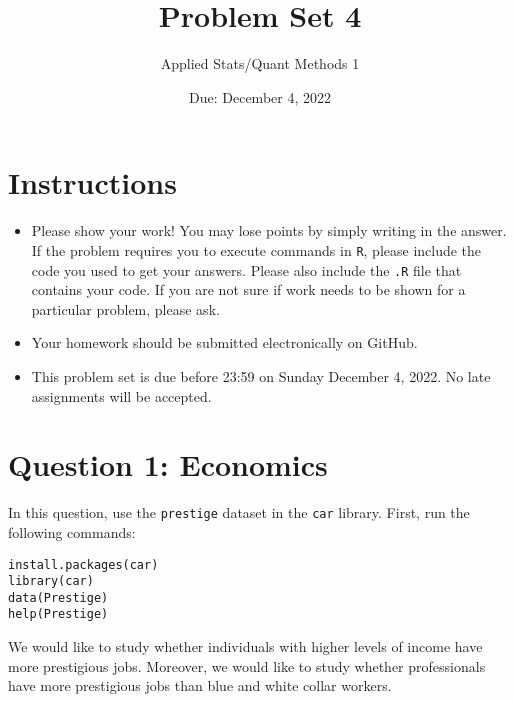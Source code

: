 \documentclass[12pt,letterpaper]{article}
\title{Problem Set 4}
\date{Due: December 4, 2022}
\author{Applied Stats/Quant Methods 1}
\begin{document}
	\maketitle
	\section*{Instructions}
	\begin{itemize}
		\item Please show your work! You may lose points by simply writing in the answer. If the problem requires you to execute commands in \texttt{R}, please include the code you used to get your answers. Please also include the \texttt{.R} file that contains your code. If you are not sure if work needs to be shown for a particular problem, please ask.
		\item Your homework should be submitted electronically on GitHub.
		\item This problem set is due before 23:59 on Sunday December 4, 2022. No late assignments will be accepted.
	\end{itemize}



	\vspace{.5cm}
\section*{Question 1: Economics}
\vspace{.25cm}
\noindent 	
In this question, use the \texttt{prestige} dataset in the \texttt{car} library. First, run the following commands:

\begin{verbatim}
install.packages(car)
library(car)
data(Prestige)
help(Prestige)
\end{verbatim} 


\noindent We would like to study whether individuals with higher levels of income have more prestigious jobs. Moreover, we would like to study whether professionals have more prestigious jobs than blue and white collar workers.
\end{document}
